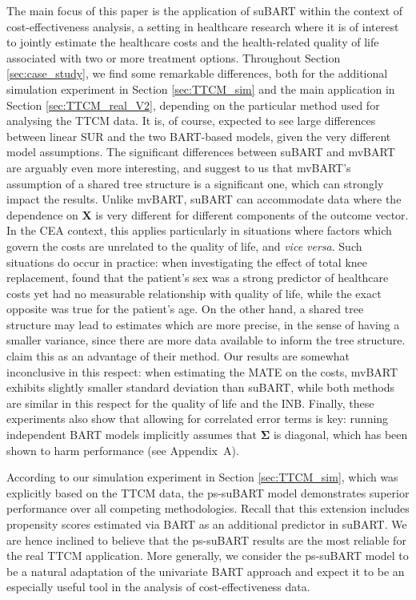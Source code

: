 \documentclass[aoas,preprint]{imsart}
\theoremstyle{plain}
\theoremstyle{definition}
\theoremstyle{remark}
\begin{document}
The main focus of this paper is the application of suBART within the context of cost-effectiveness analysis, a setting in healthcare research where it is of interest to jointly estimate the healthcare costs and the health-related quality of life associated with two or more treatment options. Throughout Section \ref{sec:case_study}, we find some remarkable differences, both for the additional simulation experiment in Section \ref{sec:TTCM_sim} and the main application in Section \ref{sec:TTCM_real_V2}, depending on the particular method used for analysing the TTCM data. It is, of course, expected to see large differences between linear SUR and the two BART-based models, given the very different model assumptions. The significant differences between suBART and mvBART are arguably even more interesting, and suggest to us that mvBART's assumption of a shared tree structure is a significant one, which can strongly impact the results. 
Unlike mvBART, suBART can accommodate data where the dependence on $\mathbf{X}$ is very different for different components of the outcome vector. In the CEA context, this applies particularly in situations where factors which govern the costs are unrelated to the quality of life, and \textit{vice versa}. Such situations do occur in practice: when investigating the effect of total knee replacement, \citet{dakin2012rationing} found that the patient's sex was a strong predictor of healthcare costs yet had no measurable relationship with quality of life, while the exact opposite was true for the patient's age. On the other hand, a shared tree structure may lead to estimates which are more precise, in the sense of having a smaller variance, since there are more data available to inform the tree structure. \citet{um2023bayesian} claim this as an advantage of their method. Our results are somewhat inconclusive in this respect: when estimating the MATE on the costs, mvBART exhibits slightly smaller standard deviation than suBART, while both methods are similar in this respect for the quality of life and the INB. Finally, these experiments also show that allowing for correlated error terms is key: running independent BART models implicitly assumes that $\boldsymbol{\Sigma}$ is diagonal, which has been shown to harm performance (see Appendix~A).

According to our simulation experiment in Section \ref{sec:TTCM_sim}, which was explicitly based on the TTCM data, the ps-suBART model demonstrates superior performance over all competing methodologies. Recall that this extension includes propensity scores estimated via BART as an additional predictor in suBART. 
We are hence inclined to believe that the ps-suBART results are the most reliable for the real TTCM application. More generally, we consider the ps-suBART model to be a natural adaptation of the univariate BART approach and expect it to be an especially useful tool in the analysis of cost-effectiveness data.
\end{document}
